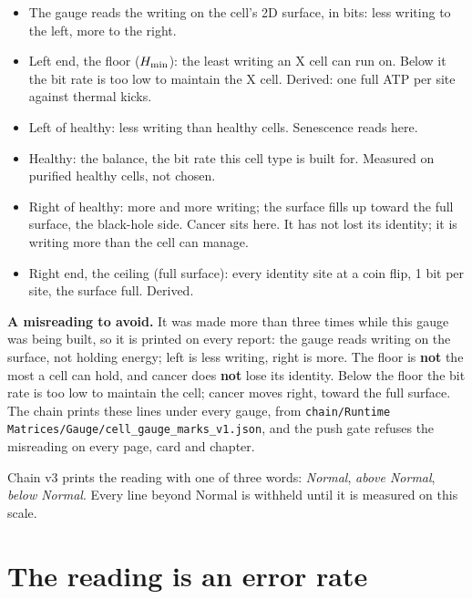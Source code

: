 \begin{keybox}[title=How to read this gauge]
\begin{itemize}
\item The gauge reads the writing on the cell's 2D surface, in bits: less writing to the left, more to the right.
\item Left end, the floor ($H_{\min}$): the least writing an X cell can run on. Below it the bit rate is too low to maintain the X cell. Derived: one full ATP per site against thermal kicks.
\item Left of healthy: less writing than healthy cells. Senescence reads here.
\item Healthy: the balance, the bit rate this cell type is built for. Measured on purified healthy cells, not chosen.
\item Right of healthy: more and more writing; the surface fills up toward the full surface, the black-hole side. Cancer sits here. It has not lost its identity; it is writing more than the cell can manage.
\item Right end, the ceiling (full surface): every identity site at a coin flip, 1 bit per site, the surface full. Derived.
\end{itemize}
\textbf{A misreading to avoid.} It was made more than three times while this gauge was being built, so it is printed on every report: the gauge reads writing on the surface, not holding energy; left is less writing, right is more. The floor is \textbf{not} the most a cell can hold, and cancer does \textbf{not} lose its identity. Below the floor the bit rate is too low to maintain the cell; cancer moves right, toward the full surface. %
The chain prints these lines under every gauge, from \texttt{chain/Runtime Matrices/Gauge/cell\_gauge\_marks\_v1.json}, and the push gate refuses the misreading on every page, card and chapter.
\end{keybox}

\begin{keybox}[title=What the chain prints today]
Chain v3 prints the reading with one of three words: \emph{Normal}, \emph{above Normal}, \emph{below Normal}. Every line
beyond Normal is withheld until it is measured on this scale.
\end{keybox}

\section{The reading is an error rate}

